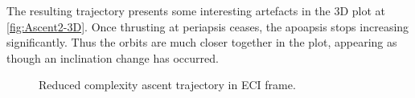 The resulting trajectory presents some interesting artefacts in the 3D plot at \autoref{fig:Ascent2-3D}. Once thrusting at periapsis ceases, the apoapsis stops increasing significantly. Thus the orbits are much closer together in the plot, appearing as though an inclination change has occurred.

\begin{figure}
\caption{Reduced complexity ascent trajectory in ECI frame.}
\label{fig:Ascent2-3D}
\centering
\def\svgwidth{\figurewidth}

\end{figure}

%
%
%
%
%
%
%
%
%
%
%


